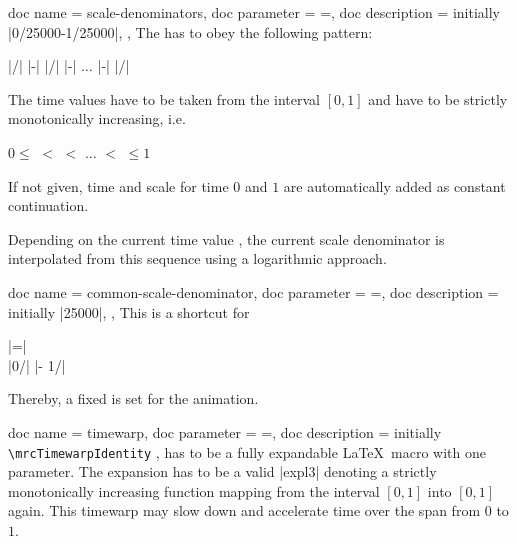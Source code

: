 \begin{docMrcKeys}[
    doc keypath = anim,
    doc new     = 2023-07-31,
  ]{
    {
      doc name        = scale-denominators,
      doc parameter   = {=},
      doc description = {initially |0/25000-1/25000|},
    },
  }
  The  has to obey the following pattern:
  \par
  |/| |-|
  |/| |-| $\ldots$ |-|
  |/|
  \par
  The time values have to be taken from the interval $[0,1]$ and have to be
  strictly monotonically increasing, i.e.
  \par
  $0\le$  $<$
   $<$ $\ldots$ $<$
   $\le 1$
  \par
  If not given, time and scale for time $0$ and $1$ are automatically added
  as constant continuation.\par
  Depending on the current time value , the current
  scale denominator  is interpolated from this
  sequence using a logarithmic approach.
\end{docMrcKeys}


\begin{docMrcKeys}[
    doc keypath = anim,
    doc new     = 2023-07-31,
  ]{
    {
      doc name        = common-scale-denominator,
      doc parameter   = {=},
      doc description = {initially |25000|},
    },
  }
  This is a shortcut for\par
   |=|\\
  \hspace*{5mm} |0/| |- 1/|
  \par
  Thereby, a fixed  is set for the animation.
\end{docMrcKeys}


\clearpage
\begin{docMrcKeys}[
    doc keypath = anim,
    doc new     = 2023-07-31,
  ]{
    {
      doc name        = timewarp,
      doc parameter   = {=},
      doc description = initially \texttt{\textbackslash mrcTimewarpIdentity}
    },
  }
   has to be a fully expandable \LaTeX\ macro with one parameter.
  The expansion has to be a valid |expl3| 
  denoting a strictly monotonically increasing function mapping from
  the interval \mbox{$[0,1]$} into \mbox{$[0,1]$} again.
  This timewarp may slow down and accelerate time over the span from $0$ to $1$.
\end{docMrcKeys}


